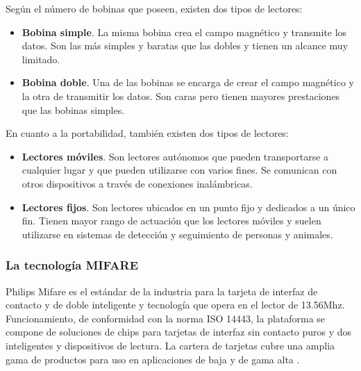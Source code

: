   Según el número de bobinas que poseen, existen dos tipos de lectores:
  \begin{itemize}
  \item \textbf{Bobina simple}. La misma bobina crea el campo magnético y
  transmite los datos. Son las más simples y baratas que las dobles y tienen
  un alcance muy limitado.
  \item \textbf{Bobina doble}. Una de las bobinas se encarga de crear el
  campo magnético y la otra de transmitir los datos. Son caras pero tienen
  mayores prestaciones que las bobinas simples.
  \end{itemize}
  
  En cuanto a la portabilidad, también existen dos tipos de lectores:
  \begin{itemize}
  \item \textbf{Lectores móviles}. Son lectores autónomos que pueden 
  transportarse a cualquier lugar y que pueden utilizarse con varios fines. Se
  comunican con otros dispositivos a través de conexiones inalámbricas.
  \item \textbf{Lectores fijos}. Son lectores ubicados en un punto fijo y 
  dedicados a un único fin. Tienen mayor rango de actuación que los lectores
  móviles y suelen utilizarse en sistemas de detección y seguimiento de
  personas y animales.
  \end{itemize}

    \subsubsection{La tecnología MIFARE}

Philips Mifare es el estándar de la industria para la tarjeta de interfaz de contacto y de doble inteligente y tecnología que opera en el lector de 13.56Mhz. Funcionamiento, de conformidad con la norma ISO 14443, la plataforma se compone de soluciones de chips para tarjetas de interfaz sin contacto puros y dos inteligentes y dispositivos de lectura. La cartera de tarjetas cubre una amplia gama de productos para uso en aplicaciones de baja y de gama alta
\cite{bib:mifare}.


